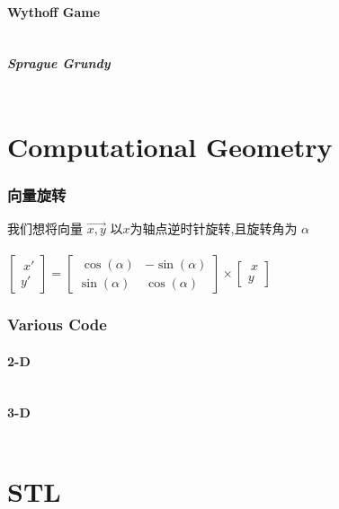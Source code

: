 \documentclass[a4paper,10pt]{article}
\begin{document}
			\subsection{Wythoff Game}
				\inputminted[breaklines]{c++}{Math/Wythoff.cc}
			\subsubsection{Sprague Grundy}
                \inputminted[breaklines]{c++}{Math/SG.cc}
	
	\newpage
	\part{Computational Geometry}
        \section{向量旋转}
        我们想将向量 $\overrightarrow {x, y}$ 以$x$为轴点逆时针旋转,且旋转角为 $\alpha $\\ \\
        $ \left[\begin{array}{cc}\  x' \\   y' \end{array}\right]=\left[\begin{array}{cc}\ \cos(\alpha) &-\sin(\alpha) \\   \sin(\alpha) & \cos(\alpha) \end{array}\right] \times \left[\begin{array}{cc}\  x \\   y \end{array}\right]$
        \section{Various Code}
            \subsection{2-D}
                \inputminted[breaklines]{c++}{ComputationalGeometry/2-d.cc}
            \subsection{3-D}
                \inputminted[breaklines]{c++}{ComputationalGeometry/3-d.cc}
	
	\newpage
	\part{STL} %
\end{document}
